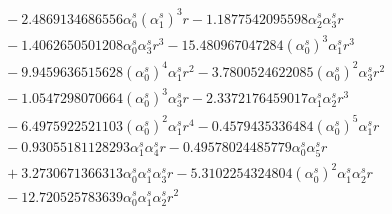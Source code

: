 \documentclass[10pt]{article}
\begin{document}
\begin{align*}
&{}  - 2.4869134686556 \alpha_{0}^s \left(\alpha_{1}^s\right)^{3} r - 1.1877542095598 \alpha_{2}^s \alpha_{3}^s r \\
&{}  - 1.4062650501208 \alpha_{0}^s \alpha_{3}^s r^{3} - 15.480967047284 \left(\alpha_{0}^s\right)^{3} \alpha_{1}^s r^{3} \\
&{}  - 9.9459636515628 \left(\alpha_{0}^s\right)^{4} \alpha_{1}^s r^{2} - 3.7800524622085 \left(\alpha_{0}^s\right)^{2} \alpha_{3}^s r^{2} \\
&{}  - 1.0547298070664 \left(\alpha_{0}^s\right)^{3} \alpha_{3}^s r - 2.3372176459017 \alpha_{1}^s \alpha_{2}^s r^{3} \\
&{}  - 6.4975922521103 \left(\alpha_{0}^s\right)^{2} \alpha_{1}^s r^{4} - 0.4579435336484 \left(\alpha_{0}^s\right)^{5} \alpha_{1}^s r \\
&{}  - 0.93055181128293 \alpha_{1}^s \alpha_{4}^s r - 0.49578024485779 \alpha_{0}^s \alpha_{5}^s r \\
&{}  + 3.2730671366313 \alpha_{0}^s \alpha_{1}^s \alpha_{3}^s r - 5.3102254324804 \left(\alpha_{0}^s\right)^{2} \alpha_{1}^s \alpha_{2}^s r \\
&{}  - 12.720525783639 \alpha_{0}^s \alpha_{1}^s \alpha_{2}^s r^{2}
\end{align*}
\end{document}
